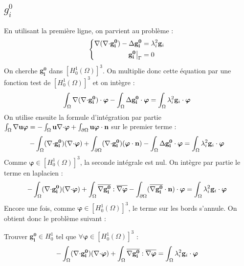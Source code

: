 \subsection{$g_i^0$}
En utilisant la première ligne, on parvient au problème :
\begin{equation*}
\left\{\begin{aligned}
{\nabla}({\nabla\cdot} \mathbf{g_i^0})-{\Delta} \mathbf{g_i^0} &= \lambda_i^2\mathbf{g}_i\\
\mathbf{g_i^0}{\big\rvert_{\Gamma}} &= 0
\end{aligned}\right.
\end{equation*}
On cherche $\mathbf{g_i^0}$ dans $[H^1_0(\Omega)]^3$. On multiplie donc cette équation par une fonction test de $[H^1_0(\Omega)]^3$ et on intègre :
\[ \int_\Omega {\nabla}({\nabla\cdot} \mathbf{g_i^0})\cdot\bm{\varphi} - \int_\Omega {\Delta} \mathbf{g_i^0}\cdot\bm{\varphi} = \int_\Omega \lambda_i^2\mathbf{g}_i\cdot\bm{\varphi} \]
On utilise ensuite la formule d'intégration par partie $\int_\Omega {\nabla}{\mathbf{u}}\bm{\varphi} = -\int_\Omega \mathbf{u}{\nabla\cdot}\bm{\varphi} + \int_{\partial\Omega} \mathbf{u}\bm{\varphi}\cdot \mathbf{n}$ sur le premier terme :
\[ -\int_\Omega ({\nabla\cdot} \mathbf{g_i^0})({\nabla\cdot}\bm{\varphi}) + \int_{\partial\Omega} ({\nabla\cdot} \mathbf{g_i^0})(\bm{\varphi}\cdot \mathbf{n}) - \int_\Omega {\Delta} \mathbf{g_i^0}\cdot\bm{\varphi} = \int_\Omega \lambda_i^2\mathbf{g}_i\cdot\bm{\varphi} \]
Comme $\bm{\varphi}\in [H^1_0(\Omega)]^3$, la seconde intégrale est nul. On intègre par partie le terme en laplacien :
\[ -\int_\Omega ({\nabla\cdot} \mathbf{g_i^0})({\nabla\cdot}\bm{\varphi}) + \int_\Omega \overline{{\nabla} \mathbf{g_i^0}}:\overline{{\nabla}\bm{\varphi}} - \int_{\partial\Omega} (\overline{{\nabla} \mathbf{g_i^0}}\cdot \mathbf{n})\cdot\bm{\varphi} = \int_\Omega \lambda_i^2\mathbf{g}_i\cdot\bm{\varphi} \]
Encore une fois, comme $\bm{\varphi}\in [H^1_0(\Omega)]^3$, le terme sur les bords s'annule. On obtient donc le problème suivant :
\begin{pb}\label{fvgi0}
Trouver $\mathbf{g_i^0}\in H^1_0$ tel que $\forall \bm{\varphi}\in [H^1_0(\Omega)]^3$ :
\begin{equation*}
-\int_\Omega ({\nabla\cdot} \mathbf{g_i^0})({\nabla\cdot}\bm{\varphi}) + \int_\Omega \overline{{\nabla} \mathbf{g_i^0}}:\overline{{\nabla}\bm{\varphi}} = \int_\Omega \lambda_i^2\mathbf{g}_i\cdot\bm{\varphi}
\end{equation*}\end{pb}

